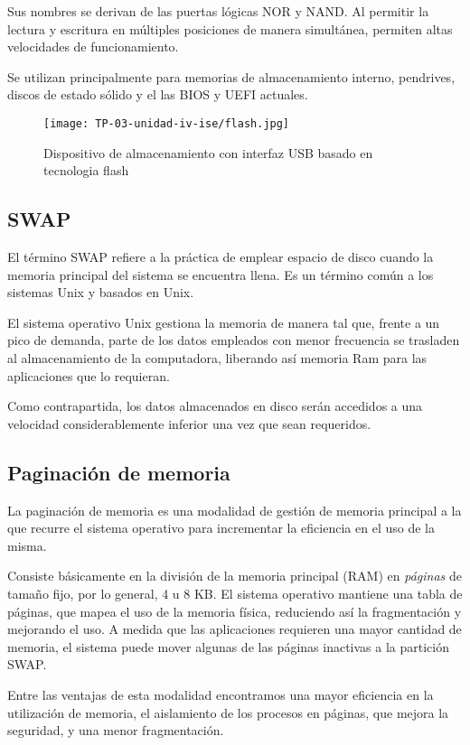 \documentclass[12pt]{article}
\begin{document}
Sus nombres se derivan de las puertas lógicas NOR y NAND.
Al permitir la lectura y escritura en múltiples posiciones de manera simultánea,
permiten altas velocidades de funcionamiento.

Se utilizan principalmente para memorias de almacenamiento interno,
pendrives, discos de estado sólido y el las BIOS y UEFI actuales.

\begin{figure}[ht]
  \centering
  \texttt{[image: TP-03-unidad-iv-ise/flash.jpg]}
  \caption{Dispositivo de almacenamiento con interfaz USB basado en tecnologia flash}
\end{figure}

\subsection{SWAP}

El término SWAP refiere a la práctica de emplear espacio de disco cuando 
la memoria principal del sistema se encuentra llena.
Es un término común a los sistemas Unix y basados en Unix.

El sistema operativo Unix gestiona la memoria de manera tal que,
frente a un pico de demanda, 
parte de los datos empleados con menor frecuencia se trasladen al almacenamiento
de la computadora, liberando así memoria Ram para las aplicaciones que lo 
requieran.

Como contrapartida, 
los datos almacenados en disco serán accedidos a una velocidad considerablemente
inferior una vez que sean requeridos.

\subsection{Paginación de memoria}

La paginación de memoria es una modalidad de gestión de memoria principal
a la que recurre el sistema operativo para incrementar la eficiencia en el 
uso de la misma.

Consiste básicamente en la división de la memoria principal (RAM) en 
\textit{páginas} de tamaño fijo,
por lo general,
4 u 8 KB.
El sistema operativo mantiene una tabla de páginas,
que mapea el uso de la memoria física,
reduciendo así la fragmentación y mejorando el uso.
A medida que las aplicaciones requieren una mayor cantidad de memoria,
el sistema puede mover algunas de las páginas inactivas a la partición SWAP.

Entre las ventajas de esta modalidad encontramos una mayor eficiencia en 
la utilización de memoria, el aislamiento de los procesos en páginas, que 
mejora la seguridad, y una menor fragmentación.
\end{document}
